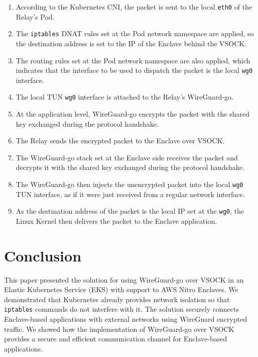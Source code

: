 \documentclass[a4paper, twocolumn]{article}
\begin{document}
\begin{enumerate}

\item According to the Kubernetes CNI, the packet is sent to the local
\texttt{eth0} of the Relay's Pod.

\item The \texttt{iptables} DNAT rules set at the Pod network namespace are applied, so
the destination address is set to the IP of the Enclave behind the VSOCK.\@

\item The routing rules set at the Pod network namespace are also applied,
which indicates that the interface to be used to dispatch the packet is the
local \texttt{wg0} interface.

\item The local TUN \texttt{wg0} interface is attached to the Relay's
WireGuard-go.

\item At the application level, WireGuard-go encrypts the packet with the
shared key exchanged during the protocol handshake.

\item The Relay sends the encrypted packet to the Enclave over VSOCK.\@

\item The WireGuard-go stack set at the Enclave side receives the packet and
decrypts it with the shared key exchanged during the protocol handshake.

\item The WireGuard-go then injects the unencrypted packet into the local
\texttt{wg0} TUN interface, as if it were just received from a regular network
interface.

\item As the destination address of the packet is the local IP set at the
\texttt{wg0}, the Linux Kernel then delivers the packet to the Enclave
application.

\end{enumerate}

\section{Conclusion}

This paper presented the solution for using WireGuard-go over VSOCK in an
Elastic Kubernetes Service (EKS) with support to AWS Nitro Enclaves. We
demonstrated that Kubernetes already provides network isolation so that
\texttt{iptables} commands do not interfere with it. The solution securely
connects Enclave-based applications with external networks using WireGuard
encrypted traffic. We showed how the implementation of WireGuard-go over VSOCK
provides a secure and efficient communication channel for Enclave-based
applications.

\nocite{*} %




%
\end{document}
